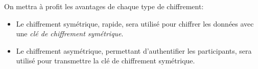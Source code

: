 \documentclass[svgnames,11pt]{beamer}
\begin{document}
\begin{frame}
    \frametitle{}
    \begin{aretenir}[]
        On mettra à profit les avantages de chaque type de chiffrement:
        \begin{itemize}
            \item Le chiffrement symétrique, rapide, sera utilisé pour chiffrer les données avec une \emph{clé de chiffrement symétrique}.
            \item Le chiffrement asymétrique, permettant d'authentifier les participants, sera utilisé pour transmettre la clé de chiffrement symétrique.
        \end{itemize}
        \end{aretenir}
    
\end{frame}
\end{document}

